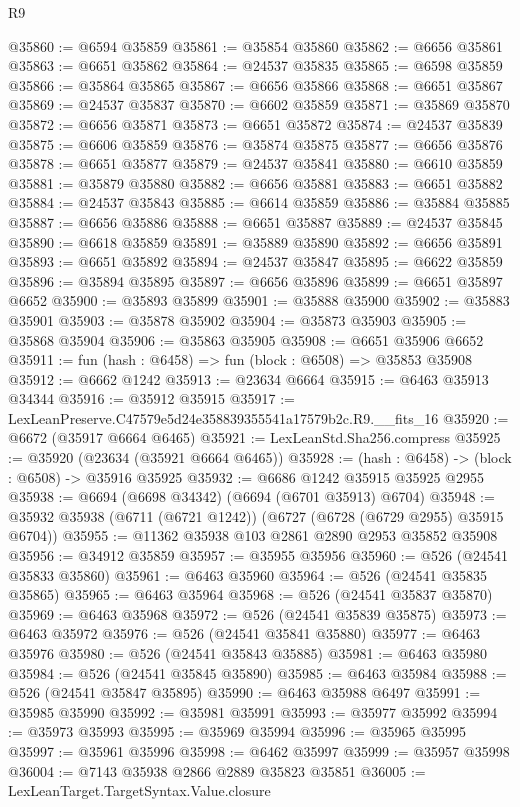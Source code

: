 \begin{lexlean}{R9}
\begin{coremodule}
@35860 := @6594 @35859
@35861 := @35854 @35860
@35862 := @6656 @35861
@35863 := @6651 @35862
@35864 := @24537 @35835
@35865 := @6598 @35859
@35866 := @35864 @35865
@35867 := @6656 @35866
@35868 := @6651 @35867
@35869 := @24537 @35837
@35870 := @6602 @35859
@35871 := @35869 @35870
@35872 := @6656 @35871
@35873 := @6651 @35872
@35874 := @24537 @35839
@35875 := @6606 @35859
@35876 := @35874 @35875
@35877 := @6656 @35876
@35878 := @6651 @35877
@35879 := @24537 @35841
@35880 := @6610 @35859
@35881 := @35879 @35880
@35882 := @6656 @35881
@35883 := @6651 @35882
@35884 := @24537 @35843
@35885 := @6614 @35859
@35886 := @35884 @35885
@35887 := @6656 @35886
@35888 := @6651 @35887
@35889 := @24537 @35845
@35890 := @6618 @35859
@35891 := @35889 @35890
@35892 := @6656 @35891
@35893 := @6651 @35892
@35894 := @24537 @35847
@35895 := @6622 @35859
@35896 := @35894 @35895
@35897 := @6656 @35896
@35899 := @6651 @35897 @6652
@35900 := @35893 @35899
@35901 := @35888 @35900
@35902 := @35883 @35901
@35903 := @35878 @35902
@35904 := @35873 @35903
@35905 := @35868 @35904
@35906 := @35863 @35905
@35908 := @6651 @35906 @6652
@35911 := fun (hash : @6458) => fun (block : @6508) => @35853 @35908
@35912 := @6662 @1242
@35913 := @23634 @6664
@35915 := @6463 @35913 @34344
@35916 := @35912 @35915
@35917 := LexLeanPreserve.C47579e5d24e358839355541a17579b2c.R9.__fits_16
@35920 := @6672 (@35917 @6664 @6465)
@35921 := LexLeanStd.Sha256.compress
@35925 := @35920 (@23634 (@35921 @6664 @6465))
@35928 := (hash : @6458) -> (block : @6508) -> @35916 @35925
@35932 := @6686 @1242 @35915 @35925 @2955
@35938 := @6694 (@6698 @34342) (@6694 (@6701 @35913) @6704)
@35948 := @35932 @35938 (@6711 (@6721 @1242)) (@6727 (@6728 (@6729 @2955) @35915 @6704))
@35955 := @11362 @35938 @103 @2861 @2890 @2953 @35852 @35908
@35956 := @34912 @35859
@35957 := @35955 @35956
@35960 := @526 (@24541 @35833 @35860)
@35961 := @6463 @35960
@35964 := @526 (@24541 @35835 @35865)
@35965 := @6463 @35964
@35968 := @526 (@24541 @35837 @35870)
@35969 := @6463 @35968
@35972 := @526 (@24541 @35839 @35875)
@35973 := @6463 @35972
@35976 := @526 (@24541 @35841 @35880)
@35977 := @6463 @35976
@35980 := @526 (@24541 @35843 @35885)
@35981 := @6463 @35980
@35984 := @526 (@24541 @35845 @35890)
@35985 := @6463 @35984
@35988 := @526 (@24541 @35847 @35895)
@35990 := @6463 @35988 @6497
@35991 := @35985 @35990
@35992 := @35981 @35991
@35993 := @35977 @35992
@35994 := @35973 @35993
@35995 := @35969 @35994
@35996 := @35965 @35995
@35997 := @35961 @35996
@35998 := @6462 @35997
@35999 := @35957 @35998
@36004 := @7143 @35938 @2866 @2889 @35823 @35851
@36005 := LexLeanTarget.TargetSyntax.Value.closure

\end{coremodule}
\end{lexlean}
